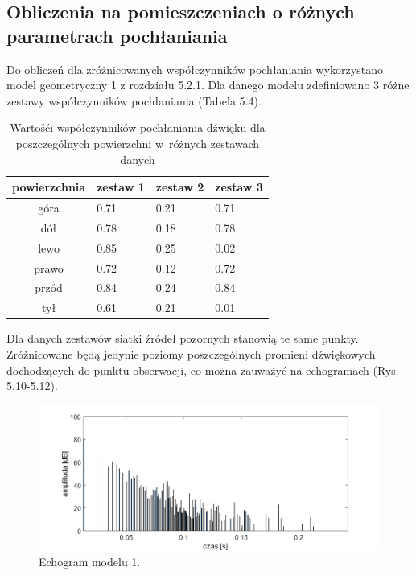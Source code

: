 
\subsection{Obliczenia na pomieszczeniach o różnych parametrach pochłaniania}\label{sec:imstest2}

Do obliczeń dla zróżnicowanych współczynników pochłaniania wykorzystano model geometryczny 1 z rozdziału 5.2.1. Dla danego modelu zdefiniowano 3 różne zestawy współczynników pochłaniania (Tabela 5.4).

\begin{table}[h]
        \centering
        \begin{threeparttable}
                \caption{Wartośći współczynników pochłaniania dźwięku dla poszczególnych powierzchni w~różnych zestawach danych}\label{tab:table_example}
                \begin{tabularx}{0.6\textwidth}{| c | X | X | X |}
                        \toprule
                        	powierzchnia &	zestaw 1 & zestaw 2 & zestaw 3 \\
                       \midrule
		góra & 0.71 & 0.21 & 0.71 \\
                        dół & 0.78 & 0.18 & 0.78 \\
		lewo & 0.85 & 0.25 & 0.02 \\
                     prawo & 0.72 & 0.12 & 0.72 \\
		przód & 0.84 & 0.24 & 0.84 \\
                    tył & 0.61 & 0.21 & 0.01 \\
                        \bottomrule
                \end{tabularx}
        \end{threeparttable}
\end{table}

Dla danych zestawów siatki źródeł pozornych stanowią te same punkty. Zróżnicowane będą jedynie poziomy poszczególnych promieni dźwiękowych dochodzących do punktu obserwacji, co można zauważyć na echogramach (Rys. 5.10-5.12).

\begin{figure}[h]
        \centering
                \centering
                \includegraphics[width=16cm]{echoz1}
	\caption{Echogram modelu 1.}
\end{figure}

